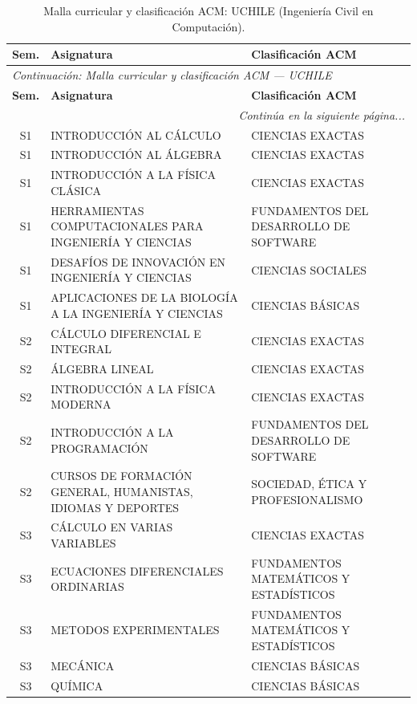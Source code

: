 \documentclass[11pt,a4paper]{article}
\begin{document}
\begin{small}
\begin{longtable}{c >{\raggedright\arraybackslash}p{8.5cm} >{\raggedright\arraybackslash}p{5.5cm}}
\caption{Malla curricular y clasificación ACM: UCHILE (Ingeniería Civil en Computación).} \label{tab:UCHILE03} \\
\toprule
\textbf{Sem.} & \textbf{Asignatura} & \textbf{Clasificación ACM} \\
\midrule
\endfirsthead
\multicolumn{3}{l}{\small\textit{Continuación: Malla curricular y clasificación ACM --- UCHILE}} \\[3pt]
\toprule
\textbf{Sem.} & \textbf{Asignatura} & \textbf{Clasificación ACM} \\
\midrule
\endhead
\midrule
\multicolumn{3}{r}{\small\textit{Continúa en la siguiente página...}} \\
\endfoot
\bottomrule
\endlastfoot
S1 & INTRODUCCIÓN AL CÁLCULO & CIENCIAS EXACTAS \\
S1 & INTRODUCCIÓN AL ÁLGEBRA & CIENCIAS EXACTAS \\
S1 & INTRODUCCIÓN A LA FÍSICA CLÁSICA & CIENCIAS EXACTAS \\
S1 & HERRAMIENTAS COMPUTACIONALES PARA INGENIERÍA Y CIENCIAS & FUNDAMENTOS DEL DESARROLLO DE SOFTWARE \\
S1 & DESAFÍOS DE INNOVACIÓN EN INGENIERÍA Y CIENCIAS & CIENCIAS SOCIALES \\
S1 & APLICACIONES DE LA BIOLOGÍA A LA INGENIERÍA Y CIENCIAS & CIENCIAS BÁSICAS \\
S2 & CÁLCULO DIFERENCIAL E INTEGRAL & CIENCIAS EXACTAS \\
S2 & ÁLGEBRA LINEAL & CIENCIAS EXACTAS \\
S2 & INTRODUCCIÓN A LA FÍSICA MODERNA & CIENCIAS EXACTAS \\
S2 & INTRODUCCIÓN A LA PROGRAMACIÓN & FUNDAMENTOS DEL DESARROLLO DE SOFTWARE \\
S2 & CURSOS DE FORMACIÓN GENERAL, HUMANISTAS, IDIOMAS Y DEPORTES & SOCIEDAD, ÉTICA Y PROFESIONALISMO \\
S3 & CÁLCULO EN VARIAS VARIABLES & CIENCIAS EXACTAS \\
S3 & ECUACIONES DIFERENCIALES ORDINARIAS & FUNDAMENTOS MATEMÁTICOS Y ESTADÍSTICOS \\
S3 & METODOS EXPERIMENTALES & FUNDAMENTOS MATEMÁTICOS Y ESTADÍSTICOS \\
S3 & MECÁNICA & CIENCIAS BÁSICAS \\
S3 & QUÍMICA & CIENCIAS BÁSICAS \\

\end{longtable}
\end{small}
\end{document}
